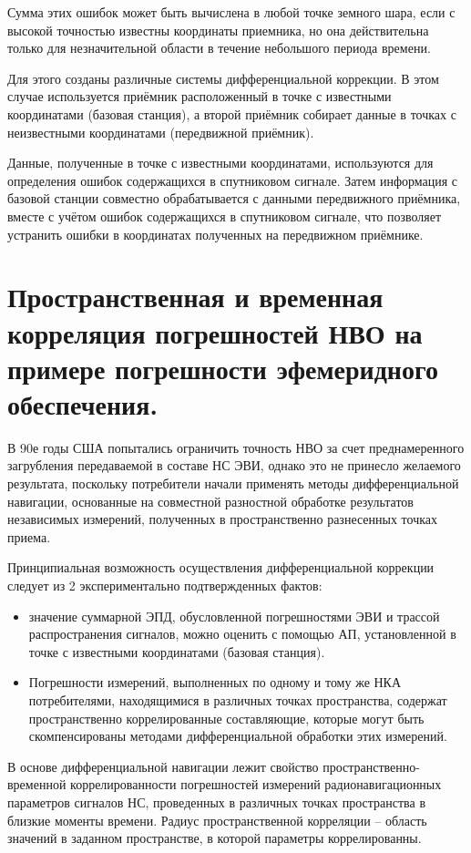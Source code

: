 \documentclass[14pt,a4paper,oneside]{extarticle}
\begin{document}
Сумма этих ошибок может быть вычислена в любой точке земного шара, если с высокой точностью известны координаты приемника, но она действительна только для незначительной области в течение небольшого периода времени.

Для этого созданы различные системы дифференциальной коррекции. В этом случае используется приёмник расположенный в точке с известными координатами (базовая станция), а второй приёмник собирает данные в точках с неизвестными координатами (передвижной приёмник).

Данные, полученные в точке с известными координатами, используются для определения ошибок содержащихся в спутниковом сигнале. Затем информация с базовой станции совместно обрабатывается с данными передвижного приёмника, вместе с учётом ошибок содержащихся в спутниковом сигнале, что позволяет устранить ошибки в координатах полученных на передвижном приёмнике.

\section{Пространственная и временная корреляция погрешностей НВО на примере погрешности эфемеридного обеспечения.}

В 90е годы США попытались ограничить точность НВО за счет преднамеренного загрубления передаваемой в составе НС ЭВИ, однако это не принесло желаемого результата, поскольку потребители начали применять методы дифференциальной навигации, основанные на совместной разностной обработке результатов независимых измерений, полученных в пространственно разнесенных точках приема.

Принципиальная возможность осуществления дифференциальной коррекции следует из 2 экспериментально подтвержденных фактов:

\begin{itemize}
    \item значение суммарной ЭПД, обусловленной погрешностями ЭВИ и трассой распространения сигналов, можно оценить с помощью АП, установленной в точке с известными координатами (базовая станция).
    \item Погрешности измерений, выполненных по одному и тому же НКА потребителями, находящимися в различных точках пространства, содержат пространственно коррелированные составляющие, которые могут быть скомпенсированы методами дифференциальной обработки этих измерений.
\end{itemize}

В основе дифференциальной навигации лежит свойство пространственно-временной коррелированности погрешностей измерений радионавигационных параметров сигналов НС, проведенных в различных точках пространства в близкие моменты времени.
Радиус пространственной корреляции – область значений в заданном пространстве, в которой параметры коррелированны.
\end{document}
